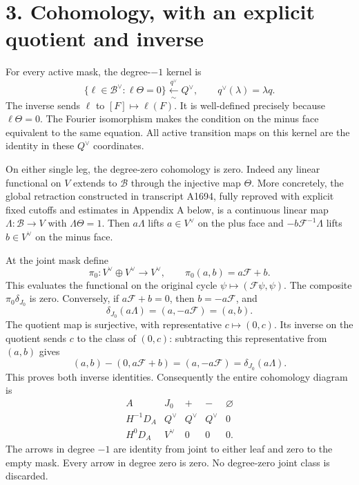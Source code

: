 \section{3. Cohomology, with an explicit quotient and
inverse}\label{TranscriptStage:proof03:cohomology-with-an-explicit-quotient-and-inverse}

For every active mask, the degree-\(-1\) kernel is \[
\{\ell\in\mathscr B^\vee:\ell\Theta=0\}
\xleftarrow[\sim]{q^\vee}Q^\vee,
\qquad q^\vee(\lambda)=\lambda q.
\] The inverse sends \(\ell\) to \([F]\mapsto\ell(F)\). It is
well-defined precisely because \(\ell\Theta=0\). The Fourier isomorphism
makes the condition on the minus face equivalent to the same equation.
All active transition maps on this kernel are the identity in these
\(Q^\vee\) coordinates.

On either single leg, the degree-zero cohomology is zero. Indeed any
linear functional on \(V\) extends to \(\mathscr B\) through the
injective map \(\Theta\). More concretely, the global retraction
constructed in transcript A1694, fully reproved with explicit fixed
cutoffs and estimates in Appendix A below, is a continuous linear map
\(\Lambda:\mathscr B\to V\) with \(\Lambda\Theta=1\). Then \(a\Lambda\)
lifts \(a\in V^\vee\) on the plus face and \(-b\mathcal F^{-1}\Lambda\)
lifts \(b\in V^\vee\) on the minus face.

At the joint mask define \[
\pi_0:V^\vee\oplus V^\vee\longrightarrow V^\vee,
\qquad\pi_0(a,b)=a\mathcal F+b.
\] This evaluates the functional on the original cycle
\(\psi\mapsto(\mathcal F\psi,\psi)\). The composite
\(\pi_0\delta_{J_0}\) is zero. Conversely, if \(a\mathcal F+b=0\), then
\(b=-a\mathcal F\), and \[
\delta_{J_0}(a\Lambda)=(a,-a\mathcal F)=(a,b).
\] The quotient map is surjective, with representative
\(c\mapsto(0,c)\). Its inverse on the quotient sends \(c\) to the class
of \((0,c)\): subtracting this representative from \((a,b)\) gives \[
(a,b)-(0,a\mathcal F+b)=(a,-a\mathcal F)=\delta_{J_0}(a\Lambda).
\] This proves both inverse identities. Consequently the entire
cohomology diagram is \[
\begin{array}{c|cccc}
A&J_0&+&-&\varnothing\\ \hline
H^{-1}D_A&Q^\vee&Q^\vee&Q^\vee&0\\
H^0D_A&V^\vee&0&0&0.
\end{array}
\] The arrows in degree \(-1\) are identity from joint to either leaf
and zero to the empty mask. Every arrow in degree zero is zero. No
degree-zero joint class is discarded.

